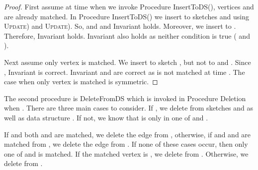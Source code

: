 \documentclass[11pt,letter]{article}
\begin{document}
\begin{proof}
First assume at time  when we invoke Procedure {\sf InsertToDS()},
vertices  and  are already matched.
In Procedure {\sf InsertToDS()} we insert  to sketches
 and  using \textsc{Update})
and \textsc{Update}).
So,  and  and  Invariant  holds.
Moreover, we insert  to .
Therefore, Invariant  holds.
Invariant  also holds as
neither condition is true ( and ).

Next assume only vertex  is matched.
We insert  to sketch , but not to  and .
Since , Invariant  is correct.
Invariant  and  are correct as  is not matched at time .
The case when only vertex  is matched is symmetric.
\end{proof}




The second procedure is {\sf DeleteFromDS}
which is invoked in Procedure {\sf Deletion} when .
There are three main cases to consider.
If ,
we delete  from sketches  and 
as well as data structure .
If not, we know that   is only in one of  and .

If  and both   and  are matched, we delete the edge from ,
otherwise, if  and  and  are matched from , we delete the edge from .
If none of these cases occur, then only one of  and  is matched.
If the matched vertex is , we delete  from .
Otherwise, we delete  from .



\begin{center}
\end{center}





\begin{center}
\end{center}
\end{document}
